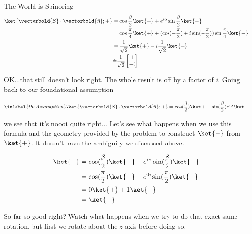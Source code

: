 \begin{answer}
\begin{answerpart}{The World is Spinoring}
    \begin{equation}
      \begin{split}
        \ket{\vectorbold{S}\cdot\vectorbold{\hat{n}}; +}
        &= \cos{\frac{\beta}{2}} \ket{+} + e^{i\alpha}\sin{\frac{\beta}{2}} \ket{-}
        \\
        &= \cos{\frac{\pi}{4}}\ket{+} + (\cos(-\frac{\pi}{2}) + i\sin(-\frac{\pi}{2}))\sin{\frac{\pi}{4}} \ket{-}
        \\
        &= \frac{1}{\sqrt{2}}\ket{+} - i\frac{1}{\sqrt{2}}\ket{-}
        \\
        &\dot{=} \frac{1}{\sqrt{2}}
        \begin{bmatrix}
          1\\-i\\
        \end{bmatrix}
        \\
      \end{split}
    \end{equation}

    OK...that still doesn't look right.  The whole result is off by a
    factor of $i$.  Going back to our foundational assumption

    \begin{equation}
      \inlabel{theAssumption}
      \ket{\vectorbold{S}\cdot\vectorbold{\hat{n}}; +}
      =
      \cos(\frac \beta 2)\ket + + \sin(\frac \beta 2) e^{i\alpha}\ket -
    \end{equation}

    we see that it's nooot quite right...  Let's see what happens when
    we use this formula and the geometry provided by the problem to
    construct $\ket{-}$ from $\ket{+}$.  It doesn't have the ambiguity
    we discussed above.

    \begin{equation}
      \begin{split}
        \ket{-}
        &= \cos(\frac{\beta}{2})\ket{+}
        +  e^{i\alpha}\sin(\frac{\beta}{2})\ket{-}
        \\
        &= \cos(\frac{\pi}{2})\ket{+}
        +  e^{0i}\sin(\frac{\pi}{2})\ket{-}
        \\
        &= 0\ket{+}
        +  1\ket{-}
        \\
        &= \ket{-}
        \\
      \end{split}
    \end{equation}

    So far so good right?  Watch what happens when we try to do that
    exact same rotation, but first we rotate about the $z$ axis before
    doing so.
    

\end{answerpart}
\end{answer}
